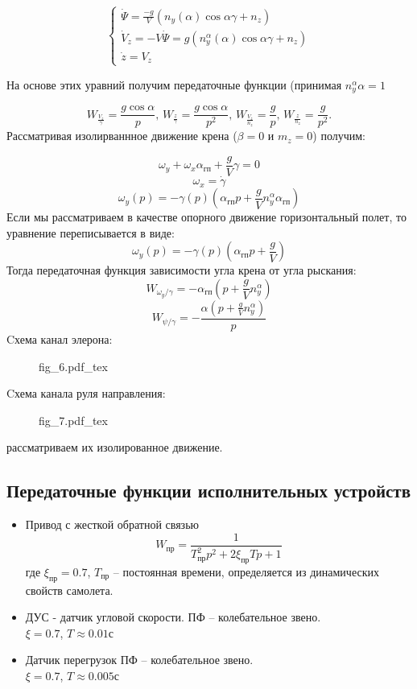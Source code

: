 \documentclass{article}
\begin{document}
\begin{equation}
	\begin{cases}
		\dot{\Psi} = \frac{-g}{V}(n_y(\alpha)\cos{\alpha}\gamma + n_z)               \\
		\dot{V}_z = -V \dot{\Psi} = g(n_y^{\alpha}(\alpha) \cos{\alpha\gamma} + n_z) \\
		\dot{z} = V_z
	\end{cases}
\end{equation}

На основе этих уравний получим передаточные функции (принимая $n_y^{\alpha} \alpha =1 $

\[
	W_{\frac{V_z}{\gamma}} = \frac{g\cos{\alpha}}{p}, \, W_{\frac{z}{\gamma}} = \frac{g\cos{\alpha}}{p^2}, \, W_{\frac{V_z}{n_z}}= \frac{g}{p}, \, W_{\frac{z}{n_z}} = \frac{g}{p^2}.
\]
Рассматривая изолирваннное движение крена ($\beta = 0$ и $m_z = 0$) получим:

\[
    \omega_y + \omega_x \alpha_{\text{гп}} + \frac{g}{V}\gamma = 0
\]
\[
	\omega_x = \dot{\gamma}
\]
\[
	\omega_y(p) = -\gamma(p)(\alpha_\text{гп}p + \frac{g}{V}n_y^\alpha \alpha_\text{гп})
\]
Если мы рассматриваем в качестве опорного движение горизонтальный полет, то уравнение переписывается в виде:
\[
	\omega_y(p) = -\gamma(p)(\alpha_\text{гп}p + \frac{g}{V})
\]
Тогда передаточная функция зависимости угла крена от угла рыскания:
\[
	W_{\omega_y/\gamma} = -\alpha_\text{гп} (p+\frac{g}{V}n_y^\alpha)
\]
\[
	W_{\psi/\gamma} = -\frac{\alpha(p + \frac{g}{V} n_y^\alpha)} {p}
\]
Cхема канал элерона:
\begin{figure}[ht]
	\centering
	{fig_6.pdf_tex}
\end{figure}
Cхема канала руля направления:
\begin{figure}[ht]
	\centering
	{fig_7.pdf_tex}
\end{figure}
рассматриваем их изолированное движение.

\subsection{Передаточные функции исполнительных устройств}
\begin{itemize}
	\item Привод с жесткой обратной связью
	      \[
		      W_\text{пр} = \frac{1}{T_\text{пр}^2p^2 + 2 \xi_\text{пр} Tp + 1}
	      \]
	      где $\xi_\text{пр} = 0.7$, $T_\text{пр}$ -- постоянная времени, определяется из динамических свойств самолета.

	\item ДУС - датчик угловой скорости.
	      ПФ -- колебательное звено.\\
          $\xi = 0.7$, $T \approx 0.01 \text{с}$
	      
	\item Датчик перегрузок
	      ПФ -- колебательное звено.\\
          $\xi = 0.7$, $T \approx 0.005 \text{с}$
\end{itemize}
\end{document}
